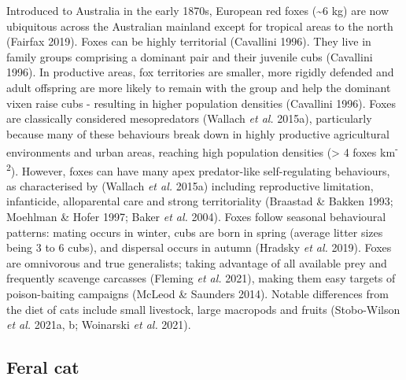 \documentclass[11pt,a4paper,titlepage,twoside,openright]{style/unimelbthesis}
\begin{document}
\begin{mainmatter}
Introduced to Australia in the early 1870s, European red foxes (\textasciitilde6 kg) are now ubiquitous across the Australian mainland except for tropical areas to the north (Fairfax 2019). Foxes can be highly territorial (Cavallini 1996). They live in family groups comprising a dominant pair and their juvenile cubs (Cavallini 1996). In productive areas, fox territories are smaller, more rigidly defended and adult offspring are more likely to remain with the group and help the dominant vixen raise cubs - resulting in higher population densities (Cavallini 1996). Foxes are classically considered mesopredators (Wallach \emph{et al.} 2015a), particularly because many of these behaviours break down in highly productive agricultural environments and urban areas, reaching high population densities (\textgreater{} 4 foxes km\textsuperscript{-2}). However, foxes can have many apex predator-like self-regulating behaviours, as characterised by (Wallach \emph{et al.} 2015a) including reproductive limitation, infanticide, alloparental care and strong territoriality (Braastad \& Bakken 1993; Moehlman \& Hofer 1997; Baker \emph{et al.} 2004). Foxes follow seasonal behavioural patterns: mating occurs in winter, cubs are born in spring (average litter sizes being 3 to 6 cubs), and dispersal occurs in autumn (Hradsky \emph{et al.} 2019). Foxes are omnivorous and true generalists; taking advantage of all available prey and frequently scavenge carcasses (Fleming \emph{et al.} 2021), making them easy targets of poison-baiting campaigns (McLeod \& Saunders 2014). Notable differences from the diet of cats include small livestock, large macropods and fruits (Stobo-Wilson \emph{et al.} 2021a, b; Woinarski \emph{et al.} 2021).

\hypertarget{feral-cat}{%
\subsection{Feral cat}\label{feral-cat}}


\end{mainmatter}
\end{document}
